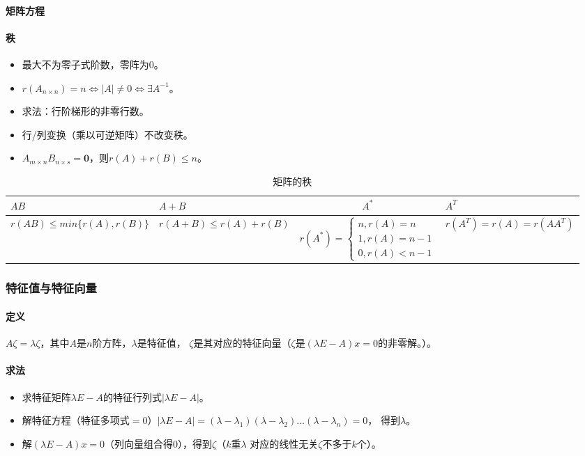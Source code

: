 \documentclass[
12pt, %
a4paper, 
oneside, %
headinclude,footinclude, %
]{scrartcl}
\begin{document}
\paragraph{矩阵方程}
\paragraph{秩}
\begin{itemize}
\item 最大不为零子式阶数，零阵为$ 0 $。
\item $ r(A_{n \times n}) = n \Leftrightarrow |A| \neq 0 \Leftrightarrow \exists A^{-1} $。
\item 求法：行阶梯形的非零行数。
\item 行/列变换（乘以可逆矩阵）不改变秩。
\item $ A_{m \times n}B_{n \times s} = \mathbf{0} $，则$ r(A) + r(B) \leq n $。
\end{itemize}

\begin{table}[hbt]
\caption{矩阵的秩}
\centering
\begin{tabular}{|p{3cm}|p{3cm}|c|p{3cm}|}
\hline
$ AB $ & $ A + B $ & $ A^* $ & $ A^T $ \\
\hline
$ r(AB) \leq min\{r(A), r(B)\} $ & $ r(A + B) \leq r(A) + r(B) $ & $ r(A^*) = \begin{cases} n, r(A) = n \\ 1,  r(A) = n - 1 \\ 0, r(A) < n - 1 \end{cases} $ & $ r(A^T) = r(A) = r(AA^T) $ \\
\hline
\end{tabular}
\end{table}
\subsubsection{特征值与特征向量}
\paragraph{定义}
$ A\zeta = \lambda\zeta $，其中$ A $是$ n $阶方阵，$ \lambda $是特征值，
$ \zeta $是其对应的特征向量（$ \zeta $是$ (\lambda E - A)x = 0 $的非零解。）。
\paragraph{求法}
\begin{itemize}
\item 求特征矩阵$ \lambda E - A $的特征行列式$ |\lambda E - A| $。
\item 解特征方程（特征多项式$ = 0 $）$ |\lambda E - A| = (\lambda - \lambda_1)(\lambda - \lambda_2)\dots(\lambda - \lambda_n) = 0 $，
得到$ \lambda $。
\item 解$ (\lambda E - A)x = 0 $（列向量组合得$ 0 $），得到$ \zeta $（$ k $重$ \lambda $
对应的线性无关$ \zeta $不多于$ k $个）。
\end{itemize}
\end{document}
